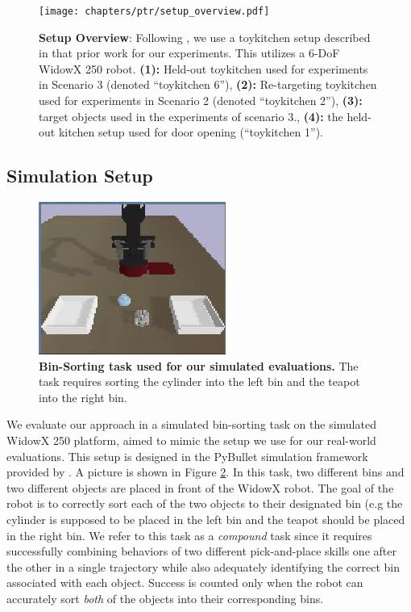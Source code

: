 \documentclass[../thesis.tex]{subfiles}
\begin{document}
\begin{figure}[h]
\centering
  \texttt{[image: chapters/ptr/setup\_overview.pdf]}
  \caption{\footnotesize{\textbf{Setup Overview}: Following \citet{ebert2021bridge}, we use a toykitchen setup described in that prior work for our experiments. This utilizes a 6-DoF WidowX 250 robot. \textbf{(1):}  Held-out toykitchen used for experiments in Scenario 3 (denoted ``toykitchen 6''), \textbf{(2):}  Re-targeting toykitchen used for experiments in Scenario 2 (denoted ``toykitchen 2''), \textbf{(3):} target objects used in the experiments of scenario 3.}, \textbf{(4):} the held-out kitchen setup used for door opening (``toykitchen 1'').}
  \label{fig:setup_overview}
  \vspace{-0.3cm}
\end{figure}



\subsection{Simulation Setup}
\label{sec:sim_appendix}

\begin{figure}{}
\centering
    \includegraphics[width=0.4\linewidth]{chapters/ptr/binsort_figure.jpg}
  \caption{\footnotesize{\textbf{Bin-Sorting task used for our simulated evaluations.} The task requires sorting the cylinder into the left bin and the teapot into the right bin.}}
  \label{app:sim_setup}
\end{figure}

We evaluate our approach in a simulated bin-sorting task on the simulated WidowX 250 platform, aimed to mimic the setup we use for our real-world evaluations. This setup is designed in the PyBullet simulation framework provided by \citet{singh2020cog}. A picture is shown in Figure \ref{app:sim_setup}. In this task, two different bins and two different objects are placed in front of the WidowX robot. The goal of the robot is to correctly sort each of the two objects to their designated bin (e.g the cylinder is supposed to be placed in the left bin and the teapot should be placed in the right bin. We refer to this task as a \emph{compound} task since it requires successfully combining behaviors of two different pick-and-place skills one after the other in a single trajectory while also adequately identifying the correct bin associated with each object. Success is counted only when the robot can accurately sort \emph{both} of the objects into their corresponding bins.
\end{document}
